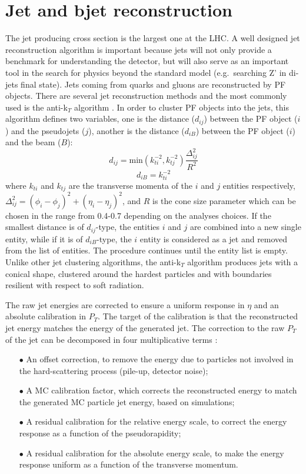 \section{Jet and bjet reconstruction}\label{sec:Jets}

The jet producing cross section is the largest one at the LHC. A well designed jet reconstruction algorithm is important because jets will not only provide a benchmark for understanding the detector, but will also serve as an important tool in the search for physics beyond the standard model (e.g.~searching Z' in di-jets final state). Jets coming from quarks and gluons are reconstructed by PF objects. There are several jet reconstruction methods and the most commonly used is the anti-k$_T$ algorithm \cite{jet_cds}. In order to cluster PF objects into the jets, this algorithm defines two variables, one is the distance ($d_{ij}$) between the PF object ($i$) and the pseudojets ($j$), another is the distance ($d_{iB}$) between the PF object ($i$) and the beam ($B$):
\begin{equation}
d_{ij}=\textrm{min}(k_{ti}^{-2},k_{tj}^{-2})\frac{\Delta^2_{ij}}{R^2}
\end{equation}
\begin{equation}
d_{iB}=k_{ti}^{-2}
\end{equation}
where $k_{ti}$ and $k_{tj}$ are the transverse momenta of the $i$ and $j$ entities respectively, $\Delta^2_{ij}=(\phi_i-\phi_j)^2+(\eta_i-\eta_j)^2$, and $R$ is the cone size parameter which can be chosen in the range from 0.4-0.7 depending on the analyses choices. If the smallest distance is of  $d_{ij}$-type, the entities $i$ and $j$ are combined into a new single entity, while if it is of $d_{iB}$-type, the $i$ entity is considered as a jet and removed from the list of entities. The procedure continues until the entity list is empty. Unlike other jet clustering algorithms, the anti-k$_T$ algorithm produces jets with a conical shape, clustered around the hardest particles and with boundaries resilient with respect to soft radiation.

The raw jet energies are corrected to ensure a uniform response in $\eta$ and an absolute calibration in $P_{T}$. The target of the calibration is that the reconstructed jet energy matches the energy of the generated jet. The correction to the raw $P_{T}$ of the jet can be decomposed in four multiplicative terms \cite{jet_cds}:
\begin{itemize}
\item[$\bullet$] An offset correction, to remove the energy due to particles not involved in the hard-scattering process (pile-up, detector noise);
\item[$\bullet$] A MC calibration factor, which corrects the reconstructed energy to match the generated MC particle jet energy, based on simulations;
\item[$\bullet$] A residual calibration for the relative energy scale, to correct the energy response as a function of the pseudorapidity;
\item[$\bullet$] A residual calibration for the absolute energy scale, to make the energy response uniform as a function of the transverse momentum.\\
\end{itemize}

